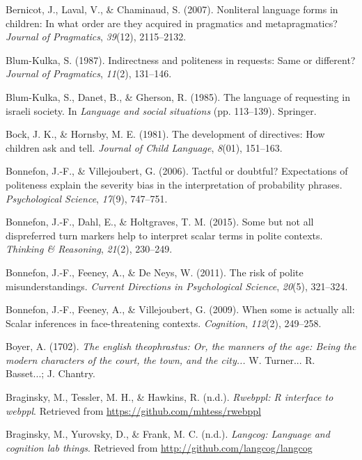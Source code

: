 \documentclass[oneside]{report}
\begin{document}
\hypertarget{ref-bernicot2007}{}
Bernicot, J., Laval, V., \& Chaminaud, S. (2007). Nonliteral language
forms in children: In what order are they acquired in pragmatics and
metapragmatics? \emph{Journal of Pragmatics}, \emph{39}(12), 2115--2132.

\hypertarget{ref-blumkulka1987}{}
Blum-Kulka, S. (1987). Indirectness and politeness in requests: Same or
different? \emph{Journal of Pragmatics}, \emph{11}(2), 131--146.

\hypertarget{ref-blum-kulka1985}{}
Blum-Kulka, S., Danet, B., \& Gherson, R. (1985). The language of
requesting in israeli society. In \emph{Language and social situations}
(pp. 113--139). Springer.

\hypertarget{ref-bock1981}{}
Bock, J. K., \& Hornsby, M. E. (1981). The development of directives:
How children ask and tell. \emph{Journal of Child Language},
\emph{8}(01), 151--163.

\hypertarget{ref-bonnefon2006}{}
Bonnefon, J.-F., \& Villejoubert, G. (2006). Tactful or doubtful?
Expectations of politeness explain the severity bias in the
interpretation of probability phrases. \emph{Psychological Science},
\emph{17}(9), 747--751.

\hypertarget{ref-bonnefon2015}{}
Bonnefon, J.-F., Dahl, E., \& Holtgraves, T. M. (2015). Some but not all
dispreferred turn markers help to interpret scalar terms in polite
contexts. \emph{Thinking \& Reasoning}, \emph{21}(2), 230--249.

\hypertarget{ref-bonnefon2011risk}{}
Bonnefon, J.-F., Feeney, A., \& De Neys, W. (2011). The risk of polite
misunderstandings. \emph{Current Directions in Psychological Science},
\emph{20}(5), 321--324.

\hypertarget{ref-bonnefon2009}{}
Bonnefon, J.-F., Feeney, A., \& Villejoubert, G. (2009). When some is
actually all: Scalar inferences in face-threatening contexts.
\emph{Cognition}, \emph{112}(2), 249--258.

\hypertarget{ref-boyer1702}{}
Boyer, A. (1702). \emph{The english theophrastus: Or, the manners of the
age: Being the modern characters of the court, the town, and the
city...} W. Turner... R. Basset...; J. Chantry.

\hypertarget{ref-R-rwebppl}{}
Braginsky, M., Tessler, M. H., \& Hawkins, R. (n.d.). \emph{Rwebppl: R
interface to webppl}. Retrieved from
\url{https://github.com/mhtess/rwebppl}

\hypertarget{ref-R-langcog}{}
Braginsky, M., Yurovsky, D., \& Frank, M. C. (n.d.). \emph{Langcog:
Language and cognition lab things}. Retrieved from
\url{http://github.com/langcog/langcog}
\end{document}

